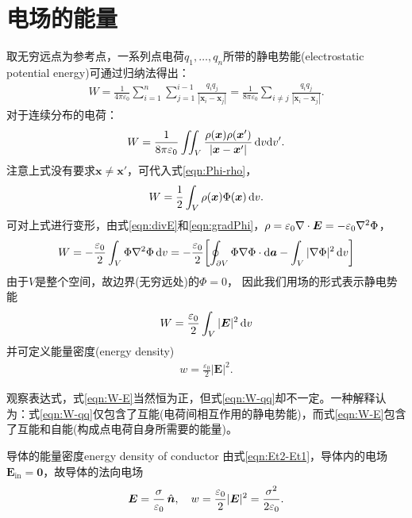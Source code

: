 \section{电场的能量}

取无穷远点为参考点，一系列点电荷$q_1,\ldots,q_n$所带的静电势能(electrostatic potential energy)可通过归纳法得出：
\begin{align}
    W=\frac1{4\pi\varepsilon_0}\sum_{i=1}^n\sum_{j=1}^{i-1}\frac{q_iq_j}{|\bm x_i-\bm x_j|}=\frac1{8\pi\varepsilon_0}\sum_{i\neq j}\frac{q_iq_j}{|\bm x_i-\bm x_j|}.
\end{align}
对于连续分布的电荷：
\begin{align*}
    \label{eqn:W-qq}
    W=\frac1{8\pi\varepsilon_0}\iint_V\frac{\rho(\bm x)\rho(\bm x')}{|\bm x-\bm x'|}\mathop{}\!\mathrm{d} v\mathrm{d} v'.
\end{align*}
注意上式没有要求$\bm x\neq\bm x'$，可代入式\eqref{eqn:Phi-rho}，
\begin{align}
    W=\frac12\int_V\rho(\bm x)\Phi(\bm x)\mathop{}\!\mathrm{d} v.
\end{align}
可对上式进行变形，由式\eqref{eqn:divE}和\eqref{eqn:gradPhi}，$\rho=\varepsilon_0\nabla\cdot\bm E=-\varepsilon_0\nabla^2\Phi$，
\begin{align*}
    W=-\frac{\varepsilon_0}2\int_V\Phi\nabla^2\Phi\mathop{}\!\mathrm{d} v=-\frac{\varepsilon_0}2\biggl[\oint_{\partial V}\Phi\nabla\Phi\cdot\mathop{}\!\mathrm{d}\bm a-\int_V|\nabla\Phi|^2\mathop{}\!\mathrm{d} v\biggr]
\end{align*}
由于$V$是整个空间，故边界(无穷远处)的$\Phi=0$，
因此我们用场的形式表示静电势能
\begin{align}
    \label{eqn:W-E}
    W=\frac{\varepsilon_0}2\int_V|\bm E|^2\mathop{}\!\mathrm{d} v
\end{align}
并可定义能量密度(energy density)
\begin{align}
    w=\frac{\varepsilon_0}2|\bm E|^2.
\end{align}

观察表达式，式\eqref{eqn:W-E}当然恒为正，但式\eqref{eqn:W-qq}却不一定。一种解释认为：式\eqref{eqn:W-qq}仅包含了互能(电荷间相互作用的静电势能)，而式\eqref{eqn:W-E}包含了互能和自能(构成点电荷自身所需要的能量)。
\begin{example}{导体的能量密度}{energy density of conductor}
    由式\eqref{eqn:Et2-Et1}，导体内的电场$\bm E_\text{in}=\bm 0$，故导体的法向电场
    \[
        \bm E=\frac\sigma{\varepsilon_0}\mathop{}\!\hat{\bm{n}},\quad w=\frac{\varepsilon_0}2|\bm E|^2=\frac{\sigma^2}{2\varepsilon_0}.
    \]
\end{example}

